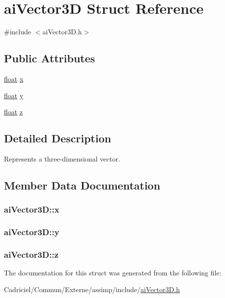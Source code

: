\hypertarget{structai_vector3_d}{\section{ai\-Vector3\-D Struct Reference}
\label{structai_vector3_d}
}


{\ttfamily \#include $<$ai\-Vector3\-D.\-h$>$}

\subsection*{Public Attributes}
\begin{DoxyCompactItemize}
\item 
\hyperlink{fmod_8h_aeb841aa4b4b5f444b5d739d865b420af}{float} \hyperlink{structai_vector3_d_a3762d39eeb99def9ebd413b2bb8dd470}{x}
\item 
\hyperlink{fmod_8h_aeb841aa4b4b5f444b5d739d865b420af}{float} \hyperlink{structai_vector3_d_ac7b5fcc03324f8c3bc8429c95882dfb8}{y}
\item 
\hyperlink{fmod_8h_aeb841aa4b4b5f444b5d739d865b420af}{float} \hyperlink{structai_vector3_d_a2b93b892064995e8d24f4e3352175aae}{z}
\end{DoxyCompactItemize}


\subsection{Detailed Description}
Represents a three-\/dimensional vector. 

\subsection{Member Data Documentation}
\hypertarget{structai_vector3_d_a3762d39eeb99def9ebd413b2bb8dd470}{
\subsubsection[{x}]{ ai\-Vector3\-D\-::x}}\label{structai_vector3_d_a3762d39eeb99def9ebd413b2bb8dd470}
\hypertarget{structai_vector3_d_ac7b5fcc03324f8c3bc8429c95882dfb8}{
\subsubsection[{y}]{ ai\-Vector3\-D\-::y}}\label{structai_vector3_d_ac7b5fcc03324f8c3bc8429c95882dfb8}
\hypertarget{structai_vector3_d_a2b93b892064995e8d24f4e3352175aae}{
\subsubsection[{z}]{ ai\-Vector3\-D\-::z}}\label{structai_vector3_d_a2b93b892064995e8d24f4e3352175aae}


The documentation for this struct was generated from the following file\-:\begin{DoxyCompactItemize}
\item 
Cadriciel/\-Commun/\-Externe/assimp/include/\hyperlink{ai_vector3_d_8h}{ai\-Vector3\-D.\-h}\end{DoxyCompactItemize}

